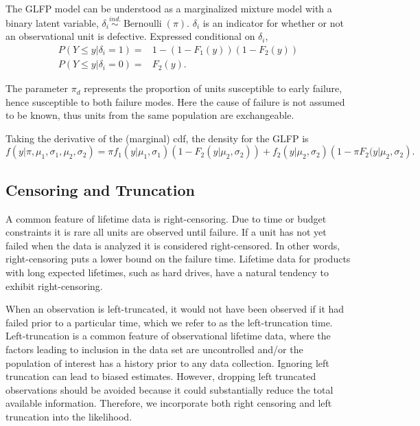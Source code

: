 \documentclass[12pt]{article}
\newcommand{\ind}{\stackrel{ind.}{\sim}}
\newcommand{\op}{\operatorname}
\begin{document}
The GLFP model can be understood as a marginalized mixture model with a binary latent variable, $\delta_i\ind \op{Bernoulli}(\pi)$. $\delta_i$ is an indicator for whether or not an observational unit is defective. Expressed conditional on $\delta_i$,
\begin{align*}
P(Y\le y | \delta_i=1) =& 1 -(1-F_1(y))(1-F_2(y))\\
P(Y\le y | \delta_i=0) =& F_2(y).
\end{align*}

 
The parameter $\pi_d$ represents the proportion of units susceptible to early failure, hence susceptible to both failure modes. Here the cause of failure is not assumed to be known, thus units from the same population are exchangeable.

Taking the derivative of the (marginal) cdf, the density for the GLFP is
\begin{equation}
f(y|\pi, \mu_1,\sigma_1, \mu_2, \sigma_2) = \pi f_1(y|\mu_1,\sigma_1)\left(1-F_2(y|\mu_2,\sigma_2)\right) + f_2(y|\mu_2,\sigma_2)\left(1-\pi F_2(y|\mu_2,\sigma_2\right).
\end{equation}

\subsection{Censoring and Truncation}
A common feature of lifetime data is right-censoring. Due to time or budget constraints it is rare all units are observed until failure. If a unit has not yet failed when the data is analyzed it is considered right-censored.  In other words, right-censoring puts a lower bound on the failure time.  Lifetime data for products with long expected lifetimes, such as hard drives, have a natural tendency to exhibit right-censoring.


When an observation is left-truncated, it would not have been observed if it had failed prior to a particular time, which we refer to as the left-truncation time.  Left-truncation is a common feature of observational lifetime data, where the factors leading to inclusion in the data set are uncontrolled and/or the population of interest has a history prior to any data collection. Ignoring left truncation can lead to biased estimates. However, dropping left truncated observations should be avoided because it could substantially reduce the total available information.  Therefore, we incorporate both right censoring and left truncation into the likelihood. 
\end{document}
